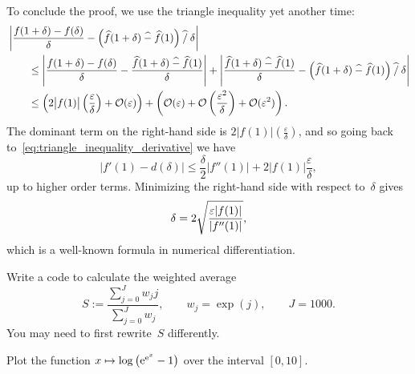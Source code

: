 \begin{solution}
\[    \]
    To conclude the proof, we use the triangle inequality yet another time:
    \begin{align*}
        & \left\lvert \frac{f(1 + \delta) - f(\delta)}{\delta} - \Bigl(\widehat f(1 + \delta) \mathbin{\widehat -} \widehat f(1)\Bigr) \mathbin{\widehat /} \delta \right\rvert \\
        &\qquad \leq 
       \left\lvert  \frac{f(1 + \delta) - f(\delta)}{\delta} - \frac{\widehat f(1 + \delta) \mathbin{\widehat -} \widehat f(1)}{\delta} \right\rvert 
       + \left\lvert  \frac{\widehat f(1 + \delta) \mathbin{\widehat -} \widehat f(1)}{\delta} -  \Bigl(\widehat f(1 + \delta) \mathbin{\widehat -} \widehat f(1)\Bigr) \mathbin{\widehat /} \delta  \right\rvert  \\
       &\qquad \leq 
       \Bigl(2  \bigl\lvert f(1) \bigr\rvert \left( \frac{\varepsilon}{\delta} \right) + \mathcal O(\varepsilon) \Bigr)       
       + \left( \mathcal O(\varepsilon) + \mathcal O\left(\frac{\varepsilon^2}{\delta} \right) + \mathcal O(\varepsilon^2)\right).
    \end{align*}
    The dominant term on the right-hand side is $2  \bigl\lvert f(1) \bigr\rvert \left( \frac{\varepsilon}{\delta} \right)$,
    and so going back to~\eqref{eq:triangle_inequality_derivative} we have
    \[
        \lvert f'(1) - d(\delta) \rvert \leq \frac{\delta}{2} \lvert f''(1) \rvert + 2 \lvert f(1) \rvert \frac{\varepsilon}{\delta},
    \]
    up to higher order terms.
    Minimizing the right-hand side with respect to~$\delta$ gives
    \[
        \delta = 2 \sqrt{\frac{\varepsilon \lvert f(1)\rvert}{\lvert f''(1)\rvert}},
    \]
    which is a well-known formula in numerical differentiation.
\end{solution}

\begin{compexercise}
    Write a code to calculate the weighted average
    \[
        S := \frac
        {\sum_{j=0}^{J} w_j j}
        {\sum_{j=0}^{J} w_j},
        \qquad w_j = \exp(j),
        \qquad J = 1000.
    \]
    You may need to first rewrite~$S$ differently.
\end{compexercise}

\begin{compexercise}
    Plot the function $x \mapsto \log\left(\mathrm e^{\mathrm e^x} - 1\right)$ over the interval $[0, 10]$.
\end{compexercise}

